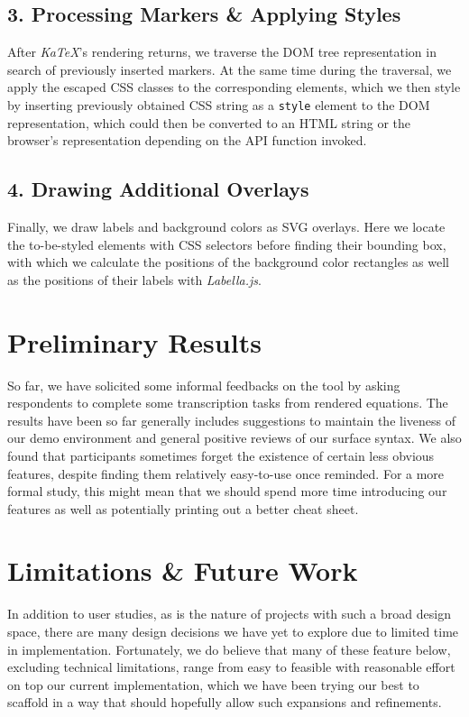 \documentclass{article}
\begin{document}
\begin{multicols*}{2}
  \subsection*{3. Processing Markers \& Applying Styles}
  After \textit{KaTeX}'s rendering returns, we traverse the DOM tree representation
  in search of previously inserted markers. At the same time during the traversal,
  we apply the escaped CSS classes to the corresponding elements, which we then style
  by inserting previously obtained CSS string as a \texttt{style} element to the DOM
  representation, which could then be converted to an HTML string or the browser's
  representation depending on the API function invoked.
  \subsection*{4. Drawing Additional Overlays}
  Finally, we draw labels and background colors as SVG overlays. Here we locate
  the to-be-styled elements with CSS selectors before finding their bounding box,
  with which we calculate the positions of the background color rectangles as well
  as the positions of their labels with \textit{Labella.js}\cite{Labella}.
  \section*{Preliminary Results}
  So far, we have solicited some informal feedbacks on the tool by asking respondents
  to complete some transcription tasks from rendered equations.
  The results have been so far generally includes suggestions to maintain the liveness
  of our demo environment and general positive reviews of our surface syntax.
  We also found that participants sometimes forget the existence of certain less
  obvious features, despite finding them relatively easy-to-use once reminded.
  For a more formal study, this might mean that we should spend more time introducing
  our features as well as potentially printing out a better cheat sheet.
  \section*{Limitations \& Future Work}\label{limitations}
  In addition to user studies, as is the nature of projects with such a broad design space,
  there are many design decisions we have yet to explore due to limited time in implementation.
  Fortunately, we do believe that many of these feature below, excluding technical limitations,
  range from easy to feasible with reasonable effort on top our current implementation, which we have been
  trying our best to scaffold in a way that should hopefully allow such expansions and refinements.

\end{multicols*}
\end{document}

